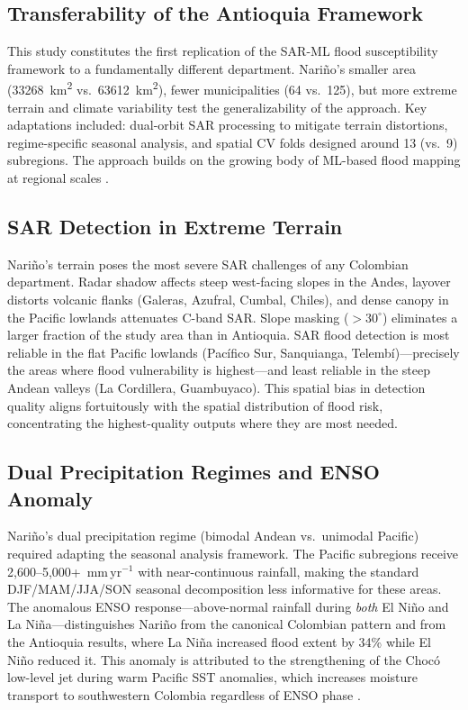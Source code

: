 \documentclass{article}
\begin{document}
\subsection{Transferability of the Antioquia Framework}

This study constitutes the first replication of the SAR-ML flood susceptibility framework \citep{EspinalMaya2026Antioquia} to a fundamentally different department. Nari\~no's smaller area (\SI{33268}{\kilo\metre\squared} vs.\ \SI{63612}{\kilo\metre\squared}), fewer municipalities (64 vs.\ 125), but more extreme terrain and climate variability test the generalizability of the approach. Key adaptations included: dual-orbit SAR processing to mitigate terrain distortions, regime-specific seasonal analysis, and spatial CV folds designed around 13 (vs.\ 9) subregions. The approach builds on the growing body of ML-based flood mapping at regional scales \citep{Magnini2022}.

\subsection{SAR Detection in Extreme Terrain}

Nari\~no's terrain poses the most severe SAR challenges of any Colombian department. Radar shadow affects steep west-facing slopes in the Andes, layover distorts volcanic flanks (Galeras, Azufral, Cumbal, Chiles), and dense canopy in the Pacific lowlands attenuates C-band SAR. Slope masking ($>30^{\circ}$) eliminates a larger fraction of the study area than in Antioquia. SAR flood detection is most reliable in the flat Pacific lowlands (Pac\'ifico Sur, Sanquianga, Telemb\'i)---precisely the areas where flood vulnerability is highest---and least reliable in the steep Andean valleys (La Cordillera, Guambuyaco). This spatial bias in detection quality aligns fortuitously with the spatial distribution of flood risk, concentrating the highest-quality outputs where they are most needed.

\subsection{Dual Precipitation Regimes and ENSO Anomaly}

Nari\~no's dual precipitation regime (bimodal Andean vs.\ unimodal Pacific) required adapting the seasonal analysis framework. The Pacific subregions receive 2,600--5,000+~mm\,yr$^{-1}$ with near-continuous rainfall, making the standard DJF/MAM/JJA/SON seasonal decomposition less informative for these areas. The anomalous ENSO response---above-normal rainfall during \textit{both} El Ni\~no and La Ni\~na---distinguishes Nari\~no from the canonical Colombian pattern and from the Antioquia results, where La Ni\~na increased flood extent by 34\% while El Ni\~no reduced it. This anomaly is attributed to the strengthening of the Choc\'o low-level jet during warm Pacific SST anomalies, which increases moisture transport to southwestern Colombia regardless of ENSO phase \citep{Poveda2001, Salas2023}.
\end{document}
